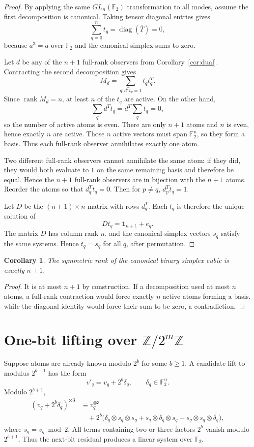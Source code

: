 \documentclass[11pt]{article}
\newtheorem{corollary}[theorem]{Corollary}
\theoremstyle{definition}
\newcommand{\F}{\mathbb{F}}
\newcommand{\Z}{\mathbb{Z}}
\newcommand{\one}{\mathbf{1}}
\newcommand{\rank}{\operatorname{rank}}
\begin{document}
\begin{proof}
By applying the same $GL_n(\F_2)$ transformation to all modes, assume the first decomposition is canonical. Taking tensor diagonal entries gives
\[
\sum_{q=0}^{n}t_q=\operatorname{diag}(\overline{T})=0,
\]
because $a^3=a$ over $\F_2$ and the canonical simplex sums to zero.

Let $d$ be any of the $n+1$ full-rank observers from Corollary~\ref{cor:dual}. Contracting the second decomposition gives
\[
M_d=\sum_{q:d^Tt_q=1}t_qt_q^T.
\]
Since $\rank M_d=n$, at least $n$ of the $t_q$ are active. On the other hand,
\[
\sum_q d^Tt_q=d^T\sum_q t_q=0,
\]
so the number of active atoms is even. There are only $n+1$ atoms and $n$ is even, hence exactly $n$ are active. Those $n$ active vectors must span $\F_2^n$, so they form a basis. Thus each full-rank observer annihilates exactly one atom.

Two different full-rank observers cannot annihilate the same atom: if they did, they would both evaluate to $1$ on the same remaining basis and therefore be equal. Hence the $n+1$ full-rank observers are in bijection with the $n+1$ atoms. Reorder the atoms so that $d_q^Tt_q=0$. Then for $p\ne q$, $d_p^Tt_q=1$.

Let $D$ be the $(n+1)\times n$ matrix with rows $d_q^T$. Each $t_q$ is therefore the unique solution of
\[
Dt_q=\one_{n+1}+e_q.
\]
The matrix $D$ has column rank $n$, and the canonical simplex vectors $s_q$ satisfy the same systems. Hence $t_q=s_q$ for all $q$, after permutation.
\end{proof}

\begin{corollary}
The symmetric rank of the canonical binary simplex cubic is exactly $n+1$.
\end{corollary}

\begin{proof}
It is at most $n+1$ by construction. If a decomposition used at most $n$ atoms, a full-rank contraction would force exactly $n$ active atoms forming a basis, while the diagonal identity would force their sum to be zero, a contradiction.
\end{proof}

\section{One-bit lifting over $\Z/2^m\Z$}
Suppose atoms are already known modulo $2^b$ for some $b\ge 1$. A candidate lift to modulus $2^{b+1}$ has the form
\[
v'_q=v_q+2^b\delta_q,\qquad \delta_q\in\F_2^n.
\]
Modulo $2^{b+1}$,
\begin{align}\label{eq:linearization}
(v_q+2^b\delta_q)^{\otimes3}
&\equiv v_q^{\otimes3}\\
&\quad+2^b\bigl(\delta_q\otimes s_q\otimes s_q+s_q\otimes\delta_q\otimes s_q+s_q\otimes s_q\otimes\delta_q\bigr),
\end{align}
where $s_q=v_q\bmod 2$. All terms containing two or three factors $2^b$ vanish modulo $2^{b+1}$. Thus the next-bit residual produces a linear system over $\F_2$.
\end{document}
